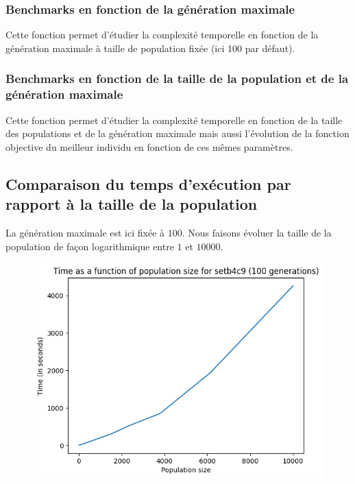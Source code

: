 \subsubsection{Benchmarks en fonction de la génération maximale}



Cette fonction permet d'étudier la complexité temporelle en fonction de la génération maximale à taille de population fixée (ici 100 par défaut).

\subsubsection{Benchmarks en fonction  de la taille de la population et de la génération maximale}



Cette fonction permet d'étudier la complexité temporelle en fonction de la taille des populations et de la génération maximale mais aussi l'évolution de la fonction objective du meilleur individu en fonction de ces mêmes paramètres.

\subsection{Comparaison du temps d'exécution par rapport à la taille de la population}

La génération maximale est ici fixée à $100$. Nous faisons évoluer la taille de la population de façon logarithmique entre $1$ et $10000$.

\begin{figure}[!h]
    \centering
    \includegraphics[scale=0.9]{report/Pictures/setb4c9_benchmarks_population.png}
\end{figure}

